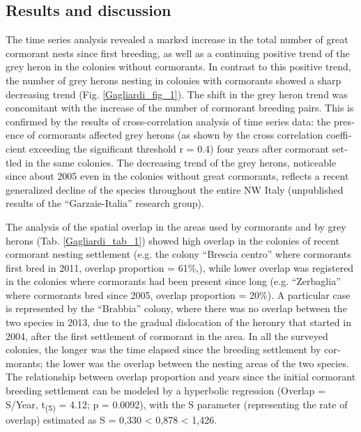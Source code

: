 \begin{otherlanguage}{english}
\section*{Results and discussion}
The time series analysis revealed a marked increase in the total number
of great cormorant nests since first breeding, as well as a continuing
positive trend of the grey heron in the colonies without cormorants. In
contrast to this positive trend, the number of grey herons nesting in
colonies with cormorants showed a sharp decreasing trend (Fig. \ref{Gagliardi_fig_1}). The
shift in the grey heron trend was concomitant with the increase of the
number of cormorant breeding pairs. This is confirmed by the results of
cross-correlation analysis of time series data: the presence of
cormorants affected grey herons (as shown by the cross correlation
coefficient exceeding the significant threshold r = 0.4) four years
after cormorant settled in the same colonies. The decreasing trend of
the grey herons, noticeable since about 2005 even in the colonies
without great cormorants, reflects a recent generalized decline of the
species throughout the entire NW Italy (unpublished results of the
{\textquotedblleft}Garzaie-Italia{\textquotedblright} research group).

The analysis of the spatial overlap in the areas used by cormorants and
by grey herons (Tab. \ref{Gagliardi_tab_1}) showed high overlap in the colonies of recent
cormorant nesting settlement (e.g. the colony
{\textquotedblleft}Brescia centro{\textquotedblright} where cormorants
first bred in 2011, overlap proportion = 61\%,), while lower overlap
was registered in the colonies where cormorants had been present since
long (e.g. {\textquotedblleft}Zerbaglia{\textquotedblright} where
cormorants bred since 2005, overlap proportion = 20\%). A particular
case is represented by the
{\textquotedblleft}Brabbia{\textquotedblright} colony, where there was
no overlap between the two species in 2013, due to the gradual
dislocation of the heronry that started in 2004, after the first
settlement of cormorant in the area. In all the surveyed colonies, the
longer was the time elapsed since the breeding settlement by
cormorants; the lower was the overlap between the nesting areas of the
two species. The relationship between overlap proportion and years
since the initial cormorant breeding settlement can be modeled by a
hyperbolic regression (Overlap = S/Year, t\textsubscript{(5)} = 4.12; p
= 0.0092), with the S parameter (representing the rate of overlap)
estimated as S = 0,330 {\textless} 0,878 {\textless} 1,426. 


\end{otherlanguage}
